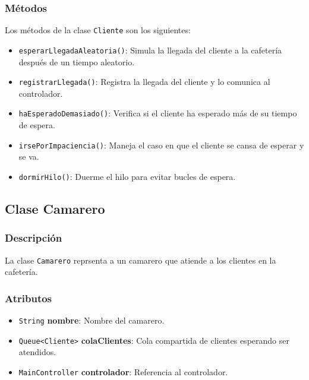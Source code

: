\documentclass[12pt]{article}
\begin{document}
\subsubsection{Métodos}

\justify
Los métodos de la clase \texttt{Cliente} son los siguientes:

\begin{itemize}

    \item \texttt{esperarLlegadaAleatoria()}: Simula la llegada del cliente a la cafetería después de un tiempo aleatorio.
    \item \texttt{registrarLlegada()}: Registra la llegada del cliente y lo comunica al controlador.
    \item \texttt{haEsperadoDemasiado()}: Verifica si el cliente ha esperado más de su tiempo de espera.
    \item \texttt{irsePorImpaciencia()}: Maneja el caso en que el cliente se cansa de esperar y se va.
    \item \texttt{dormirHilo()}: Duerme el hilo para evitar bucles de espera.

\end{itemize}

\newpage

\subsection{Clase Camarero}

\subsubsection{Descripción}
La clase \texttt{Camarero} reprsenta a un camarero que atiende a los clientes en la cafetería.

\subsubsection{Atributos}

\begin{itemize}

    \item \texttt{String} \textbf{nombre}: Nombre del camarero.
    \item \texttt{Queue<Cliente>} \textbf{colaClientes}: Cola compartida de clientes esperando ser atendidos.
    \item \texttt{MainController} \textbf{controlador}: Referencia al controlador.

\end{itemize}
\end{document}
